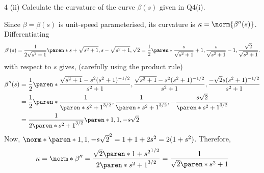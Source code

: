 \documentclass[11pt]{penrose}
\begin{document}
\begin{problem}{4 (ii)}
    Calculate the curvature of the curve $\beta(s)$ given in Q4(i).

    \solution Since $\beta = \beta(s)$ is unit-speed parameterised, its curvature is $\kappa = \norm{\beta''(s)}$. Differentiating
    \begin{equation*}
        \beta'(s)
        = \frac{1}{2\sqrt{s^2 + 1}}
        \paren*{s + \sqrt{s^2 + 1}, s - \sqrt{s^2 + 1}, \sqrt{2} }
        = \frac{1}{2}
        \paren*{\frac{s}{\sqrt{s^2 + 1}} + 1, \frac{s}{\sqrt{s^2 + 1}} - 1, \frac{\sqrt{2}}{\sqrt{s^2 + 1}} }.
    \end{equation*}
    with respect to $s$ gives, (carefully using the product rule)
    \begin{align*}
        \beta''(s)
        &= \frac{1}{2}
        \paren*{
            \frac{\sqrt{s^2 + 1} - s^2 (s^2 + 1)^{-1/2}}{s^2 + 1},
            \frac{\sqrt{s^2 + 1} - s^2 (s^2 + 1)^{-1/2}}{s^2 + 1},
            \frac{- \sqrt{2} s (s^2 + 1)^{-1/2}}{s^2 + 1}
        }\\
        &= \frac{1}{2}
        \paren*{
            \frac{1}{\paren*{s^2 + 1}^{3/2}},
            \frac{1}{\paren*{s^2 + 1}^{3/2}},
            -\frac{s\sqrt{2}}{\paren*{s^2 + 1}^{3/2}}
        }\\
        &= \frac{1}{2 \paren*{s^2 + 1}^{3/2}} \paren*{ 1, 1, -s\sqrt{2}}
    \end{align*}
    Now, $\norm*{\paren*{ 1, 1, -s\sqrt{2}}}^2 = 1 + 1 + 2s^2 = 2 (1 + s^2)$. Therefore,
    \begin{equation*}
        \kappa
        = \norm*{\beta''}
        = \frac{\sqrt{2} \paren*{ 1 + s^2 }^{1/2}}{2 \paren*{s^2 + 1}^{3/2}}
        = \frac{1}{\sqrt{2} \paren*{s^2 + 1}}
    \end{equation*}
\end{problem}
\end{document}
